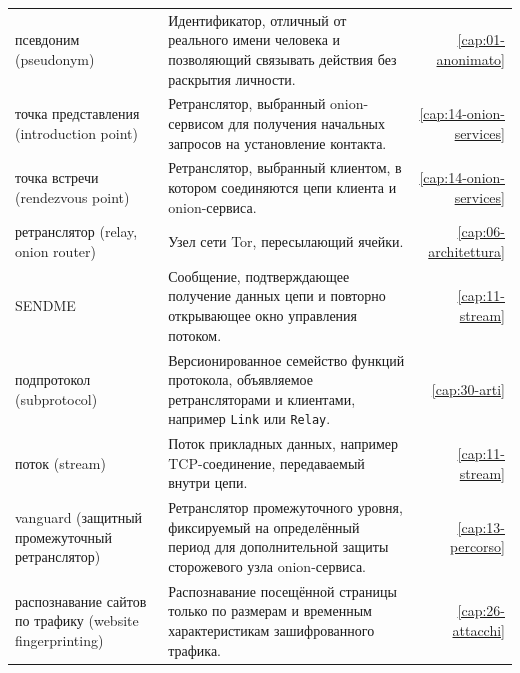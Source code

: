 {\begin{longtable}{@{}>{\raggedright\arraybackslash}p{4.1cm}>{\raggedright\arraybackslash}p{8.0cm}r@{}}
псевдоним (pseudonym) & Идентификатор, отличный от реального имени человека и позволяющий связывать действия без раскрытия личности. & \ref{cap:01-anonimato} \\
точка представления (introduction point) & Ретранслятор, выбранный onion-сервисом для получения начальных запросов на установление контакта. & \ref{cap:14-onion-services} \\
точка встречи (rendezvous point) & Ретранслятор, выбранный клиентом, в котором соединяются цепи клиента и onion-сервиса. & \ref{cap:14-onion-services} \\
ретранслятор (relay, onion router) & Узел сети Tor, пересылающий ячейки. & \ref{cap:06-architettura} \\
SENDME & Сообщение, подтверждающее получение данных цепи и повторно открывающее окно управления потоком. & \ref{cap:11-stream} \\
подпротокол (subprotocol) & Версионированное семейство функций протокола, объявляемое ретрансляторами и клиентами, например \texttt{Link} или \texttt{Relay}. & \ref{cap:30-arti} \\
поток (stream) & Поток прикладных данных, например TCP-соединение, передаваемый внутри цепи. & \ref{cap:11-stream} \\
vanguard (защитный промежуточный ретранслятор) & Ретранслятор промежуточного уровня, фиксируемый на определённый период для дополнительной защиты сторожевого узла onion-сервиса. & \ref{cap:13-percorso} \\
распознавание сайтов по трафику (website fingerprinting) & Распознавание посещённой страницы только по размерам и временным характеристикам зашифрованного трафика. & \ref{cap:26-attacchi} \\
\end{longtable}
}
